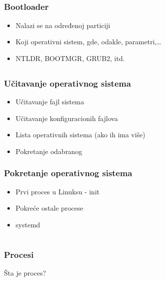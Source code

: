 \documentclass{beamer}
\begin{document}
\subsection*{}

\begin{frame}
    \frametitle{Bootloader}
    \begin{itemize}
        \item Nalazi se na određenoj particiji \newline
        \item Koji operativni sistem, gde, odakle, parametri,\dots \newline
        \item NTLDR, BOOTMGR, GRUB2, itd.
    \end{itemize}
\end{frame}
\subsection*{}
\begin{frame}
    \frametitle{Učitavanje operativnog sistema}
    \begin{itemize}
        \item Učitavanje fajl sistema \newline
        \item Učitavanje konfiguracionih fajlova \newline
        \item Lista operativnih sistema (ako ih ima više) \newline
        \item Pokretanje odabranog
    \end{itemize}
\end{frame}

\begin{frame}
    \frametitle{Pokretanje operativnog sistema}
    \begin{itemize}
        \item Prvi proces u Linuksu - init \newline
        \item Pokreće ostale procese \newline
        \item systemd \newline
    \end{itemize}
\end{frame}

\section*{}
\begin{frame}
    \frametitle{Procesi}
    \begin{center}
        \LARGE{Šta je proces?}
    \end{center}
\end{frame}
\end{document}
